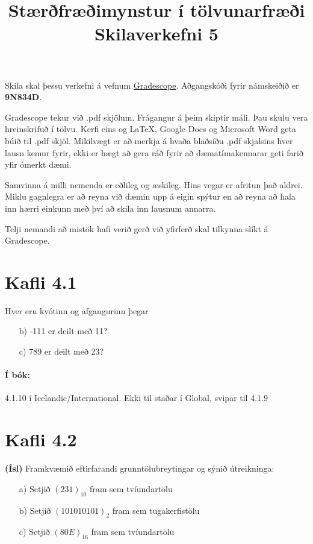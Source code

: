 \documentclass{article}
\title{Stærðfræðimynstur í tölvunarfræði \\ Skilaverkefni 5}
\author{}
\begin{document}
\maketitle

Skila skal þessu verkefni á vefnum \href{https://gradescope.com/courses/9487}{Gradescope}. Aðgangskóði fyrir námskeiðið er \textbf{9N834D}. 

Gradescope tekur við .pdf skjölum. Frágangur á þeim skiptir máli. Þau skulu vera hreinskrifuð í tölvu. Kerfi eins og \LaTeX, Google Docs og Microsoft Word geta búið til .pdf skjöl. Mikilvægt er að merkja á hvaða blaðsíðu .pdf skjalsins hver lausn kemur fyrir, ekki er hægt að gera ráð fyrir að dæmatímakennarar geti farið yfir ómerkt dæmi.

Samvinna á milli nemenda er eðlileg og æskileg. Hins vegar er afritun það aldrei. Miklu gagnlegra er að reyna við dæmin upp á eigin spýtur en að reyna að hala inn hærri einkunn með því að skila inn lausnum annarra.

Telji nemandi að mistök hafi verið gerð við yfirferð skal tilkynna slíkt á Gradescope.

\section{Kafli 4.1}

\question

Hver eru kvótinn og afgangurinn þegar

\begin{itemize}
    \item[b)] -111 er deilt með 11?
    \item[c)] 789 er deilt með 23?
\end{itemize}

\paragraph{Í bók:} 4.1.10 í Icelandic/International. Ekki til staðar í Global, svipar til 4.1.9

\section{Kafli 4.2}

\question

\textbf{(Ísl)} Framkvæmið eftirfarandi grunntölubreytingar og sýnið útreikninga:
\begin{itemize}
    \item[a)] Setjið $(231)_{10}$ fram sem tvíundartölu
    \item[b)] Setjið $(101010101)_2$ fram sem tugakerfistölu
    \item[c)] Setjið $(80E)_{16}$ fram sem tvíundartölu
\end{itemize}
\end{document}
